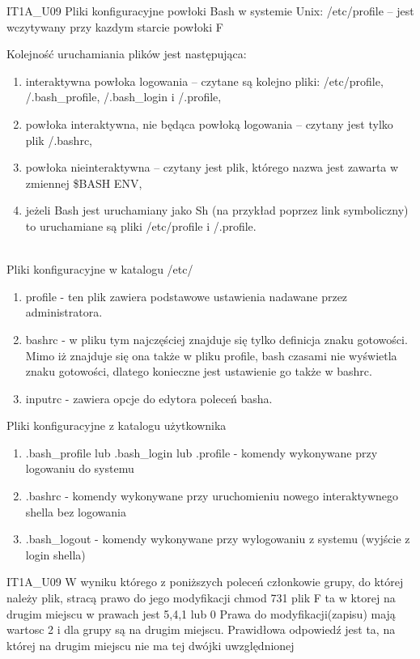 \answer
{ IT1A\_U09 Pliki konfiguracyjne powłoki Bash w systemie Unix:}
{/etc/profile – jest wczytywany przy kazdym starcie powłoki }
{F}
{
Kolejność uruchamiania plików jest następująca:
\begin{enumerate}
\item  interaktywna powłoka logowania – czytane są kolejno pliki: /etc/profile, /.bash\_profile, /.bash\_login i /.profile,
\item powłoka interaktywna, nie będąca powłoką logowania – czytany jest tylko plik /.bashrc,
\item  powłoka nieinteraktywna – czytany jest plik, którego nazwa jest zawarta w zmiennej \$BASH ENV,
\item jeżeli Bash jest uruchamiany jako Sh (na przykład poprzez link symboliczny) to uruchamiane
są pliki /etc/profile i /.profile.
\end{enumerate}


}
{
\\
Pliki konfiguracyjne w katalogu /etc/
\begin{enumerate}
\item profile - ten plik zawiera podstawowe ustawienia nadawane przez administratora.
\item bashrc - w pliku tym najczęściej znajduje się tylko definicja znaku gotowości. Mimo iż znajduje się ona także
                w pliku profile, bash czasami nie wyświetla znaku gotowości, dlatego konieczne jest ustawienie go także w bashrc.
\item inputrc - zawiera opcje do edytora poleceń basha.
\end{enumerate}
Pliki konfiguracyjne z katalogu użytkownika
\begin{enumerate}
\item .bash\_profile lub .bash\_login lub .profile - komendy wykonywane przy logowaniu do systemu
\item .bashrc - komendy wykonywane przy uruchomieniu nowego interaktywnego shella bez logowania

\item .bash\_logout - komendy wykonywane przy wylogowaniu z systemu (wyjście z login shella)
\end{enumerate}
}
\answer
{ IT1A\_U09  W wyniku którego z poniższych poleceń członkowie grupy, do której należy plik, stracą prawo  do jego modyfikacji
}
{chmod 731 plik}
{F}
{ta w ktorej na drugim miejscu w prawach jest 5,4,1 lub 0}
{Prawa do modyfikacji(zapisu) mają wartosc 2 i dla grupy są na drugim miejscu. Prawidłowa odpowiedź jest ta, na której na drugim miejscu nie ma tej dwójki uwzględnionej}



